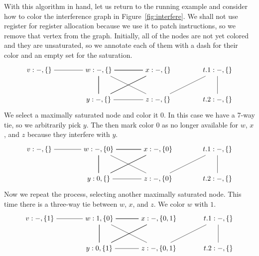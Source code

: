 \documentclass[11pt]{book}
\begin{document}
With this algorithm in hand, let us return to the running example and
consider how to color the interference graph in
Figure~\ref{fig:interfere}. We shall not use register  for
register allocation because we use it to patch instructions, so we
remove that vertex from the graph.  Initially, all of the nodes are
not yet colored and they are unsaturated, so we annotate each of them
with a dash for their color and an empty set for the saturation.
\[
\begin{tikzpicture}[baseline=(current  bounding  box.center)]
\node (v) at (0,0)    {$v:-,\{\}$};
\node (w) at (3,0)    {$w:-,\{\}$};
\node (x) at (6,0)    {$x:-,\{\}$};
\node (y) at (3,-1.5) {$y:-,\{\}$};
\node (z) at (6,-1.5) {$z:-,\{\}$};
\node (t1) at (9,0)   {$t.1:-,\{\}$};
\node (t2) at (9,-1.5) {$t.2:-,\{\}$};

\draw (v) to (w);
\foreach \i in {w,x,y}
{
  \foreach \j in {w,x,y}
  {
    \draw (\i) to (\j);
  }
}
\draw (z) to (w);
\draw (z) to (y);
\draw (t1) to (z);
\draw (t2) to (t1);
\end{tikzpicture}
\]
We select a maximally saturated node and color it $0$. In this case we
have a 7-way tie, so we arbitrarily pick $y$. The then mark color $0$
as no longer available for $w$, $x$, and $z$ because they interfere
with $y$.
\[
\begin{tikzpicture}[baseline=(current  bounding  box.center)]
\node (v) at (0,0)    {$v:-,\{\}$};
\node (w) at (3,0)    {$w:-,\{0\}$};
\node (x) at (6,0)    {$x:-,\{0\}$};
\node (y) at (3,-1.5) {$y:0,\{\}$};
\node (z) at (6,-1.5) {$z:-,\{0\}$};
\node (t1) at (9,0)   {$t.1:-,\{\}$};
\node (t2) at (9,-1.5) {$t.2:-,\{\}$};
\draw (v) to (w);
\foreach \i in {w,x,y}
{
  \foreach \j in {w,x,y}
  {
    \draw (\i) to (\j);
  }
}
\draw (z) to (w);
\draw (z) to (y);
\draw (t1) to (z);
\draw (t2) to (t1);
\end{tikzpicture}
\]
Now we repeat the process, selecting another maximally saturated node.
This time there is a three-way tie between $w$, $x$, and $z$. We color
$w$ with $1$.
\[
\begin{tikzpicture}[baseline=(current  bounding  box.center)]
\node (v) at (0,0)    {$v:-,\{1\}$};
\node (w) at (3,0)    {$w:1,\{0\}$};
\node (x) at (6,0)    {$x:-,\{0,1\}$};
\node (y) at (3,-1.5) {$y:0,\{1\}$};
\node (z) at (6,-1.5) {$z:-,\{0,1\}$};
\node (t1) at (9,0)   {$t.1:-,\{\}$};
\node (t2) at (9,-1.5) {$t.2:-,\{\}$};
\draw (t1) to (z);
\draw (t2) to (t1);
\draw (v) to (w);
\foreach \i in {w,x,y}
{
  \foreach \j in {w,x,y}
  {
    \draw (\i) to (\j);
  }
}
\draw (z) to (w);
\draw (z) to (y);
\end{tikzpicture}
\]
\end{document}
